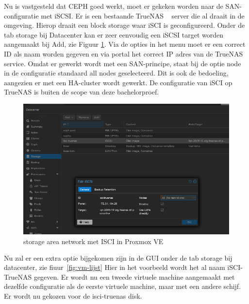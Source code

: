 Nu is vastgesteld dat CEPH goed werkt, moet er gekeken worden naar de SAN-configuratie met iSCSI.
Er is een bestaande TrueNAS ~\autocite{truenas} server die al draait in de omgeving. Hierop draait een block storage waar iSCI is geconfigureerd.
Onder de tab storage bij Datacenter kan er zeer eenvoudig een iSCSI target worden aangemaakt bij Add, zie Figuur \ref{fig:iscsi-SAN}.
Via de opties in het menu moet er een correct ID als naam worden gegeven en via portal het correct IP adres van de TrueNAS service.
Omdat er gewerkt wordt met een SAN-principe, staat bij de optie node in de configuratie standaard all nodes geselecteerd. Dit is ook de bedoeling, aangezien er met een HA-cluster wordt gewerkt.
De configuratie van iSCI op TrueNAS is buiten de scope van deze bachelorproef.
\begin{figure}[H]
  \centering
  \includegraphics[width=1.0\textwidth]{../poc/iscsi-prox.png}
  \caption{storage area network met ISCI in Proxmox VE}
  \label{fig:iscsi-SAN}
\end{figure}
Nu zal er een extra  optie bijgekomen zijn in de GUI onder de tab storage bij datacenter, zie fiuur~\ref{fig:vm-lijst}  Hier in het voorbeeld wordt het al naam iSCI-TrueNAS gegeven.
Er wordt nu een tweede virtuele machine aangemaakt met dezelfde configuratie als de eerste virtuele machine, maar met een andere schijf. Er wordt nu gekozen voor de isci-truenas disk.
